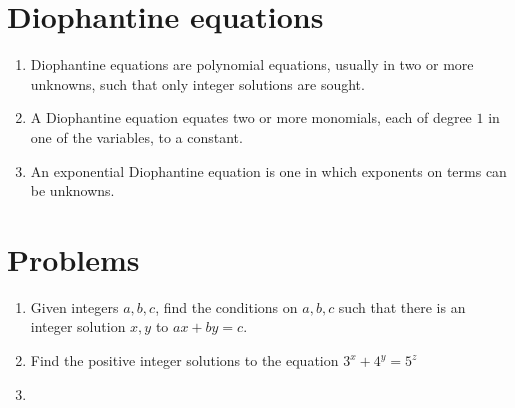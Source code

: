 \documentclass{article}
\begin{document}
	
\section*{Diophantine equations}
\begin{enumerate}
	\item 
	Diophantine equations are polynomial equations, usually in two or more unknowns, such that only integer solutions are sought.
	\item 
	A Diophantine equation equates two or more monomials, each of degree $1$ in one of the variables, to a constant.
	\item 
	An exponential Diophantine equation is one in which exponents on terms can be unknowns. 
\end{enumerate}
\section*{Problems}
\begin{enumerate}
	\item 
	Given integers $a,b,c$, find the conditions on $a,b,c$ such that there is an integer solution $x,y$ to
	$ax+by=c$.
	\item 
	Find the positive integer solutions to the equation
	$3^x+4^y=5^z$	
	\item 

\end{enumerate}
\end{document}
